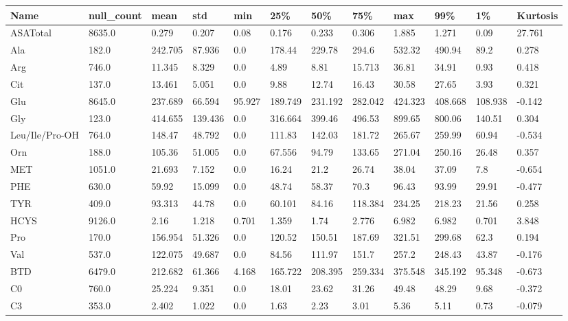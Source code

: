 \begin{tabular}{llllllllllll}
\toprule
Name & null_count & mean & std & min & 25\% & 50\% & 75\% & max & 99\% & 1\% & Kurtosis \\
\midrule

ASATotal & 8635.0 & 0.279 & 0.207 & 0.08 & 0.176 & 0.233 & 0.306 & 1.885 & 1.271 & 0.09 & 27.761 \\
Ala & 182.0 & 242.705 & 87.936 & 0.0 & 178.44 & 229.78 & 294.6 & 532.32 & 490.94 & 89.2 & 0.278 \\
Arg & 746.0 & 11.345 & 8.329 & 0.0 & 4.89 & 8.81 & 15.713 & 36.81 & 34.91 & 0.93 & 0.418 \\
Cit & 137.0 & 13.461 & 5.051 & 0.0 & 9.88 & 12.74 & 16.43 & 30.58 & 27.65 & 3.93 & 0.321 \\
Glu & 8645.0 & 237.689 & 66.594 & 95.927 & 189.749 & 231.192 & 282.042 & 424.323 & 408.668 & 108.938 & -0.142 \\
Gly & 123.0 & 414.655 & 139.436 & 0.0 & 316.664 & 399.46 & 496.53 & 899.65 & 800.06 & 140.51 & 0.304 \\
Leu/Ile/Pro-OH & 764.0 & 148.47 & 48.792 & 0.0 & 111.83 & 142.03 & 181.72 & 265.67 & 259.99 & 60.94 & -0.534 \\
Orn & 188.0 & 105.36 & 51.005 & 0.0 & 67.556 & 94.79 & 133.65 & 271.04 & 250.16 & 26.48 & 0.357 \\
MET & 1051.0 & 21.693 & 7.152 & 0.0 & 16.24 & 21.2 & 26.74 & 38.04 & 37.09 & 7.8 & -0.654 \\
PHE & 630.0 & 59.92 & 15.099 & 0.0 & 48.74 & 58.37 & 70.3 & 96.43 & 93.99 & 29.91 & -0.477 \\
TYR & 409.0 & 93.313 & 44.78 & 0.0 & 60.101 & 84.16 & 118.384 & 234.25 & 218.23 & 21.56 & 0.258 \\
HCYS & 9126.0 & 2.16 & 1.218 & 0.701 & 1.359 & 1.74 & 2.776 & 6.982 & 6.982 & 0.701 & 3.848 \\
Pro & 170.0 & 156.954 & 51.326 & 0.0 & 120.52 & 150.51 & 187.69 & 321.51 & 299.68 & 62.3 & 0.194 \\
Val & 537.0 & 122.075 & 49.687 & 0.0 & 84.56 & 111.97 & 151.7 & 257.2 & 248.43 & 43.87 & -0.176 \\
BTD & 6479.0 & 212.682 & 61.366 & 4.168 & 165.722 & 208.395 & 259.334 & 375.548 & 345.192 & 95.348 & -0.673 \\
C0 & 760.0 & 25.224 & 9.351 & 0.0 & 18.01 & 23.62 & 31.26 & 49.48 & 48.29 & 9.68 & -0.372 \\
C3 & 353.0 & 2.402 & 1.022 & 0.0 & 1.63 & 2.23 & 3.01 & 5.36 & 5.11 & 0.73 & -0.079 \\

\end{tabular}
